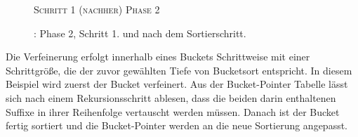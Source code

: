 \begin{figure}[H]
    {\centering\begin{minipage}{\textwidth}
        {\large \textsc{Schritt 1 (nachher)}} \hfill {\Large \textsc{Phase 2}}\par\medskip
    \end{minipage}}
    \caption[\bpr: Phase 2, Schritt 1 (nachher)]{\bpr: Phase 2, Schritt 1. \sa und \bptr nach dem Sortierschritt.}
    \label{bpr:p2s1:2}
\end{figure}
Die Verfeinerung erfolgt innerhalb eines Buckets Schrittweise mit einer Schrittgröße, die der zuvor gewählten Tiefe von Bucketsort entspricht. In diesem Beispiel wird zuerst der Bucket  verfeinert. Aus der Bucket-Pointer Tabelle lässt sich nach einem Rekursionsschritt ablesen, dass die beiden darin enthaltenen Suffixe in ihrer Reihenfolge vertauscht werden müssen. Danach ist der Bucket fertig sortiert und die Bucket-Pointer werden an die neue Sortierung angepasst.\par
